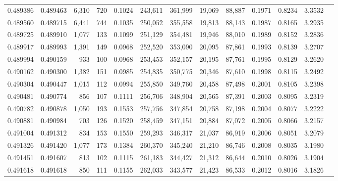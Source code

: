 \begin{tabular}{rrrrrrrrrrrrr}
0.489386 & 0.489463 & 6,310 &   720 &                                     0.1024 & 243,611 & 361,999 &  19,069 &  88,887 & 0.1971 & 0.8234 & 3.3532 \\
0.489560 & 0.489715 & 6,441 &   744 &                                     0.1035 & 250,052 & 355,558 &  19,813 &  88,143 & 0.1987 & 0.8165 & 3.2935 \\
0.489725 & 0.489910 & 1,077 &   133 &                                     0.1099 & 251,129 & 354,481 &  19,946 &  88,010 & 0.1989 & 0.8152 & 3.2836 \\
0.489917 & 0.489993 & 1,391 &   149 &                                     0.0968 & 252,520 & 353,090 &  20,095 &  87,861 & 0.1993 & 0.8139 & 3.2707 \\
0.489994 & 0.490159 &   933 &   100 &                                     0.0968 & 253,453 & 352,157 &  20,195 &  87,761 & 0.1995 & 0.8129 & 3.2620 \\
0.490162 & 0.490300 & 1,382 &   151 &                                     0.0985 & 254,835 & 350,775 &  20,346 &  87,610 & 0.1998 & 0.8115 & 3.2492 \\
0.490304 & 0.490447 & 1,015 &   112 &                                     0.0994 & 255,850 & 349,760 &  20,458 &  87,498 & 0.2001 & 0.8105 & 3.2398 \\
0.490481 & 0.490774 &   856 &   107 &                                     0.1111 & 256,706 & 348,904 &  20,565 &  87,391 & 0.2003 & 0.8095 & 3.2319 \\
0.490782 & 0.490878 & 1,050 &   193 &                                     0.1553 & 257,756 & 347,854 &  20,758 &  87,198 & 0.2004 & 0.8077 & 3.2222 \\
0.490881 & 0.490984 &   703 &   126 &                                     0.1520 & 258,459 & 347,151 &  20,884 &  87,072 & 0.2005 & 0.8066 & 3.2157 \\
0.491004 & 0.491312 &   834 &   153 &                                     0.1550 & 259,293 & 346,317 &  21,037 &  86,919 & 0.2006 & 0.8051 & 3.2079 \\
0.491326 & 0.491420 & 1,077 &   173 &                                     0.1384 & 260,370 & 345,240 &  21,210 &  86,746 & 0.2008 & 0.8035 & 3.1980 \\
0.491451 & 0.491607 &   813 &   102 &                                     0.1115 & 261,183 & 344,427 &  21,312 &  86,644 & 0.2010 & 0.8026 & 3.1904 \\
0.491618 & 0.491618 &   850 &   111 &                                     0.1155 & 262,033 & 343,577 &  21,423 &  86,533 & 0.2012 & 0.8016 & 3.1826 \\

\end{tabular}
